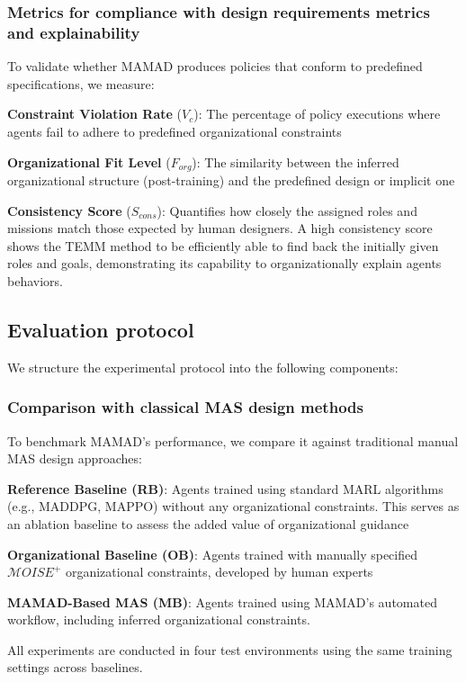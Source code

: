 \documentclass[pdflatex,sn-mathphys-num]{sn-jnl}%
\theoremstyle{thmstyleone}%
\theoremstyle{thmstyletwo}%
\theoremstyle{thmstylethree}%
\begin{document}
\subsubsection{Metrics for compliance with design requirements metrics and explainability}
To validate whether MAMAD produces policies that conform to predefined specifications, we measure:
\begin{enumerate*}[label={\roman*)}, itemjoin={; \quad}]
    \item \textbf{Constraint Violation Rate} ($V_c$): The percentage of policy executions where agents fail to adhere to predefined organizational constraints
    \item \textbf{Organizational Fit Level} ($F_{org}$): The similarity between the inferred organizational structure (post-training) and the predefined design or implicit one
    \item \textbf{Consistency Score} ($S_{cons}$): Quantifies how closely the assigned roles and missions match those expected by human designers. A high consistency score shows the TEMM method to be efficiently able to find back the initially given roles and goals, demonstrating its capability to organizationally explain agents behaviors.
\end{enumerate*}

\subsection{Evaluation protocol}

We structure the experimental protocol into the following components:

\subsubsection{Comparison with classical MAS design methods}
To benchmark MAMAD's performance, we compare it against traditional manual MAS design approaches:
\begin{enumerate*}[label={\roman*)}, itemjoin={; \quad}]
    \item \textbf{Reference Baseline (RB)}: Agents trained using standard MARL algorithms (e.g., MADDPG, MAPPO) without any organizational constraints. This serves as an ablation baseline to assess the added value of organizational guidance
    \item \textbf{Organizational Baseline (OB)}: Agents trained with manually specified $\mathcal{M}OISE^+$ organizational constraints, developed by human experts
    \item \textbf{MAMAD-Based MAS (MB)}: Agents trained using MAMAD's automated workflow, including inferred organizational constraints.
\end{enumerate*}
%
All experiments are conducted in four test environments using the same training settings across baselines.
\end{document}
